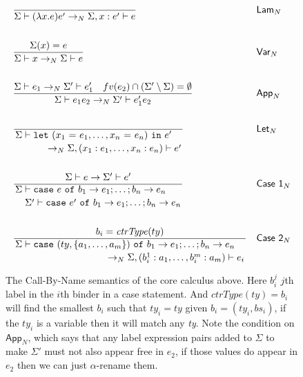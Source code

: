 \documentclass[float=false, crop=false]{standalone}
\numberwithin{subcase}{case}
\newcommand{\tcbn}{\rightarrow_N}
\begin{document}
\begin{figure}
\begin{align*}
  &\frac{}{\Sigma \vdash (\lambda x.e)e' \tcbn \Sigma,x:e' \vdash e } && \mathsf{Lam}_N \\ \\
  &\frac{\Sigma(x) = e}{\Sigma \vdash x \tcbn \Sigma \vdash e} && \mathsf{Var}_N\\ \\
  &\frac{\Sigma \vdash   e_1\tcbn \Sigma' \vdash e_1' \quad fv(e_2) \cap 
    (\Sigma' \setminus \Sigma) = \emptyset
  }{\Sigma \vdash e_1 e_2 \tcbn 
    \Sigma' \vdash e_1' e_2} && \mathsf{App}_N  \\ \\
  &\dfrac{}{\splitdfrac{\Sigma \vdash 
\mathtt{let}\ (x_1\ \mathtt{=}\ e_1,\dotsc, x_n\ \mathtt{=}\ e_n)\ \mathtt{in}\ e'}
    {\tcbn \Sigma,(x_1:e_1,\dotsc,x_n:e_n) \vdash e'}} && \mathsf{Let}_N  \\ \\
  &\dfrac{\Sigma \vdash e \rightarrow \Sigma' \vdash e'}{\splitdfrac{\Sigma \vdash 
  \mathtt{case}\ e\ \mathtt{of}\ b_1 \rightarrow e_1; \dots; b_n \rightarrow e_n}
  {\Sigma' \vdash\mathtt{case}\ e'\ \mathtt{of}\ b_1 \rightarrow e_1; \dots; b_n \rightarrow e_n}} 
      && \mathsf{Case\ 1}_N \\\\
  &\dfrac{b_i = \mathit{ctrType}(ty)}{\splitdfrac{\Sigma \vdash 
  \mathtt{case}\ (ty,\{a_1,\dotsc,a_m\}) \ \mathtt{of}\ b_1 \rightarrow e_1; \dots; b_n \rightarrow e_n}
  {\tcbn \Sigma,(b_i^1:a_1,\dotsc,b_i^m:a_m) \vdash e_i}} && \mathsf{Case\ 2}_N 
\end{align*}
\caption[The definition of the call-by-name semantics used by the core calculus]{The Call-By-Name semantics of the core calculus above.
  Here $b_i^j$ $j$th label in the $i$th binder in a case statement. And $\textit{ctrType}(ty) = b_i$ will
  find the smallest $b_i$ such that $ty_i = ty$ given $b_i = (ty_i,bs_i)$, 
  if the $\mathit{ty_i}$ is a variable then it will match any \textit{ty}.
   Note the condition on $\mathsf{App}_N$, which says that any label 
 expression pairs added to $\Sigma$ to make $\Sigma'$ must not
 also appear free in $e_2$, if those values do appear in $e_2$ then we can
 just $\alpha$-rename them.}
\label{t:cbn}
\end{figure}
\end{document}
